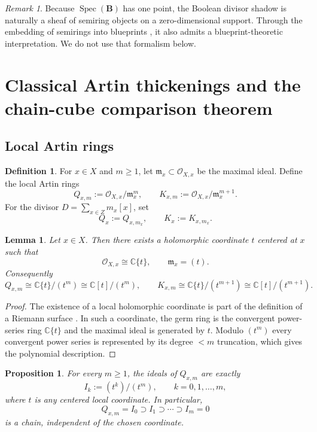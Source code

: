 \documentclass[11pt,a4paper]{article}
\numberwithin{equation}{section}
\newtheorem{proposition}[theorem]{Proposition}
\newtheorem{lemma}[theorem]{Lemma}
\theoremstyle{definition}
\newtheorem{definition}[theorem]{Definition}
\theoremstyle{remark}
\newtheorem{remark}[theorem]{Remark}
\DeclareMathOperator{\Spec}{Spec}
\newcommand{\CC}{\mathbb C}
\newcommand{\BB}{\mathbf B}
\newcommand{\cO}{\mathcal O}
\begin{document}
\begin{remark}
Because $\Spec(\BB)$ has one point, the Boolean divisor shadow is naturally a sheaf of semiring objects on a zero-dimensional support.  Through the embedding of semirings into blueprints \cite{Lorscheid}, it also admits a blueprint-theoretic interpretation.  We do not use that formalism below.
\end{remark}

\section{Classical Artin thickenings and the chain-cube comparison theorem}

\subsection{Local Artin rings}

\begin{definition}
For $x\in X$ and $m\ge1$, let $\mathfrak m_x\subset\cO_{X,x}$ be the maximal ideal.  Define the local Artin rings
\[
Q_{x,m}:=\cO_{X,x}/\mathfrak m_x^m,
\qquad
K_{x,m}:=\cO_{X,x}/\mathfrak m_x^{m+1}.
\]
For the divisor $D=\sum_{x\in Z}m_x[x]$, set
\[
Q_x:=Q_{x,m_x},\qquad K_x:=K_{x,m_x}.
\]
\end{definition}

\begin{lemma}\label{lem:dvr-local}
Let $x\in X$.  Then there exists a holomorphic coordinate $t$ centered at $x$ such that
\[
\cO_{X,x}\cong\CC\{t\},\qquad \mathfrak m_x=(t).
\]
Consequently
\[
Q_{x,m}\cong\CC\{t\}/(t^m)\cong\CC[t]/(t^m),
\qquad
K_{x,m}\cong\CC\{t\}/(t^{m+1})\cong\CC[t]/(t^{m+1}).
\]
\end{lemma}

\begin{proof}
The existence of a local holomorphic coordinate is part of the definition of a Riemann surface \cite[Chapter~1]{Lee}.  In such a coordinate, the germ ring is the convergent power-series ring $\CC\{t\}$ and the maximal ideal is generated by $t$.  Modulo $(t^m)$ every convergent power series is represented by its degree $<m$ truncation, which gives the polynomial description.
\end{proof}

\begin{proposition}\label{prop:ideal-chain-local}
For every $m\ge1$, the ideals of $Q_{x,m}$ are exactly
\[
I_k:=(t^k)/(t^m),\qquad k=0,1,\dots,m,
\]
where $t$ is any centered local coordinate.  In particular,
\[
Q_{x,m}=I_0\supset I_1\supset\cdots\supset I_m=0
\]
is a chain, independent of the chosen coordinate.
\end{proposition}
\end{document}
